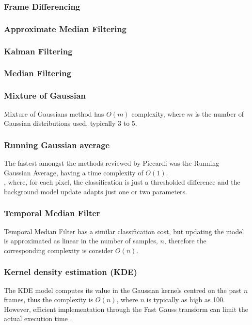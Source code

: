\subsubsection{Frame Differencing}
\subsubsection{Approximate Median Filtering} \subsubsection{Kalman Filtering}
\subsubsection{Median Filtering}
\subsubsection{Mixture of Gaussian}


Mixture of Gaussians method has $O(m)$ complexity, where $m$ is the number of Gaussian distributions used, typically 3 to 5. 


\subsubsection{Running Gaussian average}

The fastest amongst the methods reviewed by Piccardi \cite{Piccardi2004} was the Running Gaussian Average, having a time complexity of $O(1)$.\\

, where,
for
each
pixel,
the
classification is
just
a thresholded difference and the
background model update adapts
just
one
or
two
parameters.



\subsubsection{Temporal Median Filter}

Temporal Median Filter has a similar classification cost, but updating the  model is approximated as linear in the number of samples, $n$, therefore the corresponding complexity is consider $O(n)$. \\

\subsubsection{Kernel density estimation (KDE)}
The KDE model computes its value in the Gaussian kernels centred on the past 
$n$ frames, thus the complexity is $O(n)$, where $n$ is typically as high as 100. 
However, efficient implementation through the Fast Gauss transform can
limit the actual execution time \cite{Elgammal2003}.\\



